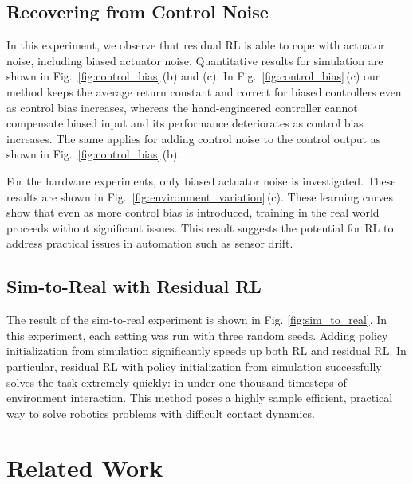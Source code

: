\subsection{Recovering from Control Noise}

In this experiment, we observe that residual RL is able to cope with actuator noise, including biased actuator noise.
Quantitative results for simulation are shown in  Fig.~\ref{fig:control_bias}\,(b) and (c). In Fig.~\ref{fig:control_bias}\,(c) our method keeps the average return constant and correct for biased controllers even as control bias increases, whereas the hand-engineered controller cannot compensate biased input and its performance deteriorates as control bias increases.
The same applies for adding control noise to the control output as shown in Fig.~\ref{fig:control_bias}\,(b).

For the hardware experiments, only biased actuator noise is investigated. These results are shown in Fig.~\ref{fig:environment_variation}\,(c). These learning curves show that even as more control bias is introduced, training in the real world proceeds without significant issues. This result suggests the potential for RL to address practical issues in automation such as sensor drift.

\subsection{Sim-to-Real with Residual RL}

The result of the sim-to-real experiment is shown in Fig. \ref{fig:sim_to_real}. In this experiment, each setting was run with three random seeds. Adding policy initialization from simulation significantly speeds up both RL and residual RL. In particular, residual RL with policy initialization from simulation successfully solves the task extremely quickly: in under one thousand timesteps of environment interaction. This method poses a highly sample efficient, practical way to solve robotics problems with  difficult contact dynamics.

\section{Related Work}\label{sec:related_work}

